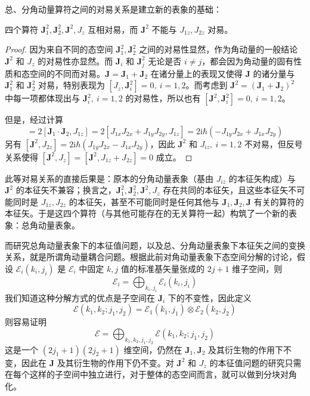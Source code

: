 \documentclass[cn,10pt,math=newtx,citestyle=gb7714-2015,bibstyle=gb7714-2015]{elegantbook}
\def\bm{\boldsymbol}
\def\ms{\mathscr}
\def\i{\mathrm i}
\def\ox{\otimes}
\begin{document}
总、分角动量算符之间的对易关系是建立新的表象的基础：
\begin{theorem}[总角动量算符与单粒子角动量算符之间的对易关系]
   四个算符 $\bm J_1^2,\bm J_2^2,\bm J^2,J_z$ 互相对易，而 $\bm J^2$ 不能与 $J_{1z},J_{2z}$ 对易。
\end{theorem}
\begin{proof}
    因为来自不同的态空间 $\bm J_1^2,\bm J_2^2$ 之间的对易性显然，作为角动量的一般结论 $\bm J^2$ 和 $J_z$ 的对易性亦显然。而 $\bm J_i$ 和 $\bm J_j^2$ 无论是否 $i\ne j$，都会因为角动量的固有性质和态空间的不同而对易。$\bm J=\bm J_1+\bm J_2$ 在诸分量上的表现又使得 $\bm J$ 的诸分量与 $\bm J_1^2$ 和 $\bm J_2^2$ 对易，特别表现为 $[J_z,\bm J_i^2]=0,\ i=1,2$。而考虑到 $\bm J^2 = (\bm J_1+\bm J_2)^2$ 中每一项都体现出与 $\bm J_i^2,\ i=1,2$ 的对易性，所以也有 $[\bm J^2,\bm J_i^2]=0,\ i=1,2$。
    
    但是，经过计算
    \begin{equation}
        [\bm J^2,J_{1z}] = 2[\bm J_1\cdot\bm J_2,J_{1z}] = 2[J_{1x}J_{2x}+J_{1y}J_{2y},J_{1z}] = 2\i\hbar(-J_{1y}J_{2x}+J_{1x}J_{2y})
    \end{equation}
    另有 $[\bm J^2,J_{2z}] = 2\i\hbar(J_{1y}J_{2x}-J_{1x}J_{2y})$，因此 $\bm J^2$ 和 $J_{iz},\ i=1,2$ 不对易，但反号关系使得 $[\bm J^2,J_z] = [\bm J^2,J_{1z}+J_{2z}] = 0$ 成立。
\end{proof}

此等对易关系的直接后果是：原本的分角动量表象（基由 $J_{iz}$ 的本征矢构成）与 $\bm J^2$ 的本征矢不兼容；换言之，$\bm J_1^2,\bm J_2^2,\bm J^2,J_z$ 存在共同的本征矢，且这些本征矢不可能同时是 $J_{1z},J_{2z}$ 的本征矢，甚至不可能同时是任何其他与 $\bm J_1,\bm J_2,\bm J$ 有关的算符的本征矢。于是这四个算符（与其他可能存在的无关算符一起）构筑了一个新的表象：总角动量表象。

而研究总角动量表象下的本征值问题，以及总、分角动量表象下本征矢之间的变换关系，就是所谓角动量耦合问题。根据此前对角动量表象下态空间分解的讨论，假设 $\ms E_i(k_i,j_i)$ 是 $\ms E_i$ 中固定 $k,j$ 值的标准基矢量张成的 $2j+1$ 维子空间，则
\begin{equation}
    \ms E_i = \bigoplus_{k_i,j_i}\ms E_i(k_i,j_i)
\end{equation}
我们知道这种分解方式的优点是子空间在 $\bm J_i$ 下的不变性，因此定义
\begin{equation}
    \ms E(k_1,k_2;j_1,j_2) = \ms E_1(k_1,j_1)\ox\ms E_2(k_2,j_2)
\end{equation}
则容易证明
\begin{equation}
    \ms E = \bigoplus_{k_1,k_2,j_1,j_2}\ms E(k_1,k_2;j_1,j_2)
\end{equation}
这是一个 $(2j_1+1)(2j_2+1)$ 维空间，仍然在 $\bm J_1,\bm J_2$ 及其衍生物的作用下不变，因此在 $\bm J$ 及其衍生物的作用下仍不变。对 $\bm J^2$ 和 $J_z$ 的本征值问题的研究只需在每个这样的子空间中独立进行，对于整体的态空间而言，就可以做到分块对角化。
\end{document}
